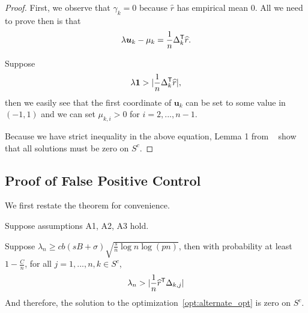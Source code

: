\begin{proof}
First, we observe that $\gamma_k = 0$ because $\hat{r}$ has empirical mean 0. All we need to prove then is that 
\[
\lambda \mbox{\boldmath $u$}_k - \mu_k = \frac{1}{n} \Delta_k^{\mathsf{T}} \widehat{r}.
\]

Suppose
\[
\lambda \mbox{\boldmath $1$} > |\frac{1}{n} \Delta_k^{\mathsf{T}}\widehat{r}|,
\]
then we easily see that the first coordinate of $\mathbf{u}_k$ can be set to some value in $(-1,1)$ and we can set $\mu_{k,i} > 0$ for $i=2,...,n-1$. 

Because we have strict inequality in the above equation, Lemma 1 from ~\cite{Wain:09a} show that all solutions must be zero on $S^c$.
\end{proof}
 
 
 
 
 
 
 \subsection{Proof of False Positive Control}
 \label{sec:false_positive_proof}
 
 We first restate the theorem for convenience.
 
 
\begin{theorem} 
Suppose assumptions A1, A2, A3 hold. 

Suppose $\lambda_n \geq c b (sB + \sigma) \sqrt{ \frac{s}{n} \log n \log (pn)}$, then with probability at least $ 1 - \frac{C}{n}$, for all $j=1,...,n,k \in S^c$,
\[
\lambda_n >  | \frac{1}{n} \widehat{r}^{\mathsf{T}} \Delta_{k,j}|
\]
And therefore, the solution to the optimization~\ref{opt:alternate_opt} is zero on $S^c$.
\end{theorem}

